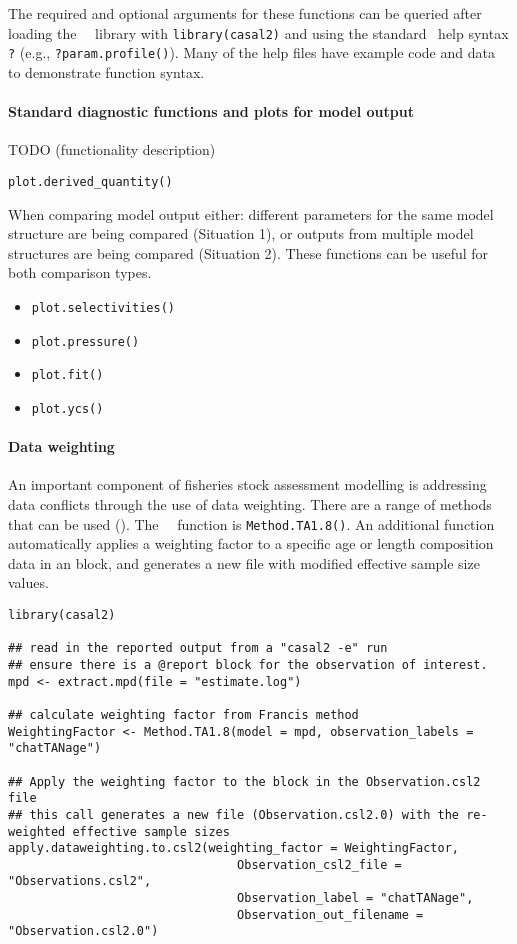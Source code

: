 The required and optional arguments for these functions can be queried after loading the \CNAME\ \R\ library with \texttt{library(casal2)} and using the standard \R\ help syntax \texttt{?} (e.g., \texttt{?param.profile()}). Many of the help files have example code and data to demonstrate function syntax.

\paragraph*{Standard diagnostic functions and plots for model output}

TODO (functionality description)

\texttt{plot.derived\_quantity()}

When comparing model output either: different parameters for the same model structure are being compared (Situation 1), or outputs from multiple model structures are being compared (Situation 2). These functions can be useful for both comparison types.

\begin{itemize}
	\item \texttt{plot.selectivities()}
	\item \texttt{plot.pressure()}
	\item \texttt{plot.fit()}
	\item \texttt{plot.ycs()}
\end{itemize}

\paragraph*{Data weighting}

An important component of fisheries stock assessment modelling is addressing data conflicts through the use of data weighting. There are a range of methods that can be used (\cite{francis2011data}). The \CNAME\ \R\ function is \texttt{Method.TA1.8()}. An additional function  automatically applies a weighting factor to a specific age or length composition data in an  block, and generates a new  file with modified effective sample size values.

\begin{lstlisting}
library(casal2)

## read in the reported output from a "casal2 -e" run
## ensure there is a @report block for the observation of interest.
mpd <- extract.mpd(file = "estimate.log")

## calculate weighting factor from Francis method
WeightingFactor <- Method.TA1.8(model = mpd, observation_labels = "chatTANage")

## Apply the weighting factor to the block in the Observation.csl2 file
## this call generates a new file (Observation.csl2.0) with the re-weighted effective sample sizes
apply.dataweighting.to.csl2(weighting_factor = WeightingFactor,
                                Observation_csl2_file = "Observations.csl2",
                                Observation_label = "chatTANage",
                                Observation_out_filename = "Observation.csl2.0")
\end{lstlisting}


